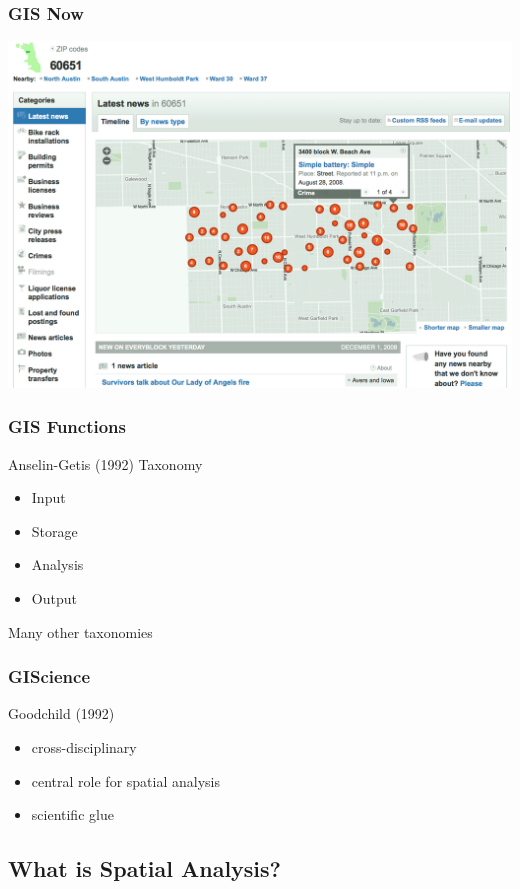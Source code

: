 \documentclass[nototal,handout]{beamer}
\begin{document}
\begin{frame}
	\frametitle{GIS Now}
 \begin{center}
 \includegraphics[width=.85\linewidth]{crimemap.png}
  \end{center}
 \end{frame} 

\begin{frame}
	\frametitle{GIS Functions}
 
\begin{block}{Anselin-Getis (1992) Taxonomy}
 \begin{itemize}
 \item  Input
 \item  Storage
 \item  \alert{Analysis}
 \item  Output
 \end{itemize}
  Many other taxonomies
 \end{block} \end{frame} 

\begin{frame}
	\frametitle{GIScience}
 
\begin{block}{Goodchild (1992)}
 \begin{itemize}
 \item  cross-disciplinary
 \item  \alert{central} role for spatial analysis
 \item  scientific \alert{glue}
 \end{itemize}
 \end{block} \end{frame} 

\subsection{What is Spatial Analysis?} 
\end{document}
